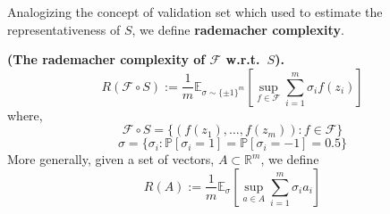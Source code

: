 Analogizing the concept of validation set which used to estimate the representativeness of $ S $, we define \textbf{rademacher complexity}.
\begin{definition}
    \textbf{(The rademacher complexity of $ \mathcal{F} $ w.r.t.\ $ S $).}
    \begin{equation}
        R( \mathcal{F} \circ S ) := \frac{1}{m} \mathbb{E}_{\sigma \sim {\{ \pm 1 \}}^m}
        \left[ \sup_{f \in \mathcal{F}} \sum^{m}_{i=1} \sigma_i f(z_i)  \right]
    \end{equation}
    where,
    \[
        \mathcal{F}\circ S = \{(f(z_1), \ldots, f(z_m)) : f \in \mathcal{F}\}
    \]
    \[
        \sigma = \{ \sigma_i : \mathbb{P}[\sigma_i = 1] = \mathbb{P}[\sigma_i = -1] = 0.5 \}
    \]
    More generally, given a set of vectors, $ A \subset \mathbb{R}^m$, we define
    \[
        R(A) := \frac{1}{m} \mathbb{E}_\sigma \left[ \sup_{a \in A} \sum^{m}_{i=1} \sigma_i a_i \right]
    \]
\end{definition}

